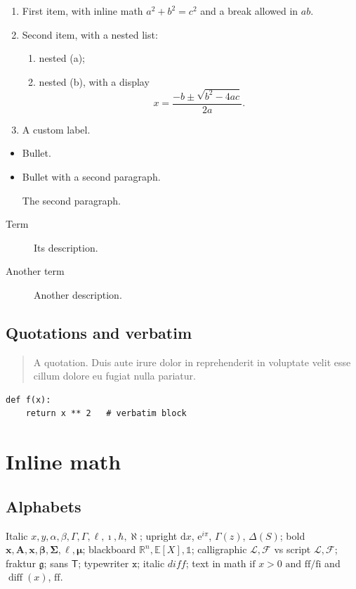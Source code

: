 \documentclass[11pt,letterpaper]{article}
\theoremstyle{definition}
\theoremstyle{remark}
\newcommand{\E}{\mathbb{E}}
\begin{document}
\begin{enumerate}
    \item First item, with inline math $a^2 + b^2 = c^2$ and a break allowed in $a\allowbreak b$.
    \item Second item, with a nested list:
    \begin{enumerate}
        \item nested (a);
        \item nested (b), with a display
        \[ x = \frac{-b \pm \sqrt{b^2 - 4ac}}{2a}. \]
    \end{enumerate}
    \item[$\star$] A custom label.
\end{enumerate}
\begin{itemize}
    \item Bullet.
    \item Bullet with a second paragraph.

    The second paragraph.
\end{itemize}
\begin{description}
    \item[Term] Its description.
    \item[Another term] Another description.
\end{description}

\subsection{Quotations and verbatim}

\begin{quote}
    A quotation. Duis aute irure dolor in reprehenderit in voluptate velit esse cillum dolore eu fugiat nulla pariatur.
\end{quote}
\begin{verbatim}
def f(x):
    return x ** 2   # verbatim block
\end{verbatim}


\section{Inline math}

\subsection{Alphabets}

Italic $x, y, \alpha, \beta, \Gamma, \varGamma, \ell, \imath, \hbar, \aleph$;
upright $\mathrm{d}x$, $\mathrm{e}^{i\pi}$, $\Gamma(z)$, $\Delta(S)$;
bold $\mathbf{x}, \mathbf{A}, \bm{x}, \bm{\beta}, \bm{\Sigma}, \bm{\ell}, \boldsymbol{\mu}$;
blackboard $\mathbb{R}^n, \E[X], \mathbb{1}$;
calligraphic $\mathcal{L}, \mathcal{F}$ vs script $\mathscr{L}, \mathscr{F}$;
fraktur $\mathfrak{g}$; sans $\mathsf{T}$; typewriter $\mathtt{x}$; italic $\mathit{diff}$;
text in math $\text{if } x > 0 \text{ and ff/fi}$ and $\operatorname{diff}(x)$, $\mathrm{ff}$.
\end{document}
